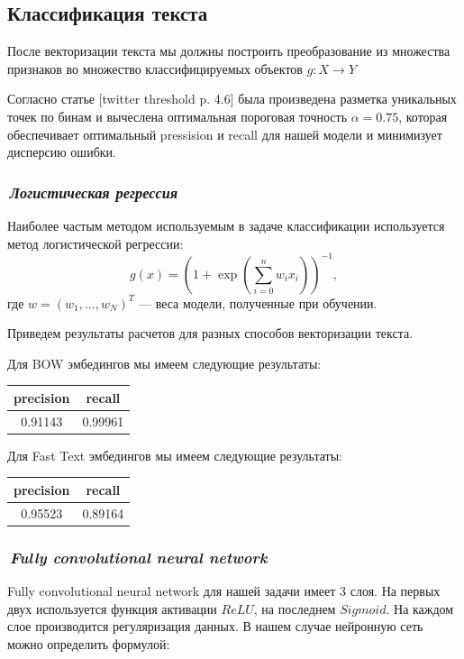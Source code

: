 \documentclass[12pt]{article}
\begin{document}
\subsection*{Классификация текста}
После векторизации текста мы должны построить преобразование из множества признаков во множество классифицируемых объектов $g: X \rightarrow Y$ 

Согласно статье [twitter threshold p. 4.6] была произведена разметка уникальных точек по бинам и вычеслена оптимальная пороговая точность $\alpha = 0.75$, которая обеспечивает оптимальный pressision и recall для нашей модели и минимизует дисперсию ошибки.

\subsubsection*{\it\,Логистическая регрессия}
Наиболее частым методом используемым в задаче классификации используется метод логистической регрессии:
$$
g(x) = \left(1 + \exp{ \left( \sum_{i=0}^n w_i x_i  \right) }\right)^{-1},
$$
где $w=(w_1, ..., w_N)^T$ --- веса модели, полученные при обучении.

Приведем результаты расчетов для разных способов векторизации текста.

Для BOW эмбедингов мы имеем следующие результаты:
\begin{center}
  \begin{tabular}{ | c | c |}
    \hline
     precision & recall \\ \hline
     0.91143 & 0.99961 \\ \hline
  \end{tabular}
\end{center}


Для Fast Text эмбедингов мы имеем следующие результаты:
\begin{center}
  \begin{tabular}{ | c | c |}
    \hline
     precision & recall \\ \hline
     0.95523 & 0.89164  \\ \hline
  \end{tabular}
\end{center}

\subsubsection*{\it\,Fully convolutional neural network}

Fully convolutional neural network для нашей задачи имеет 3 слоя. На первых двух используется функция активации $ReLU$, на последнем $Sigmoid$. На каждом слое производится регуляризация данных. В нашем случае нейронную сеть можно определить формулой:
\end{document}
